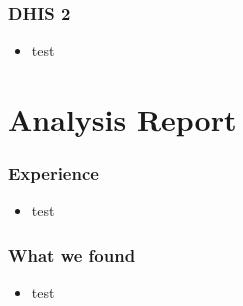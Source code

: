 \documentclass[12pt,norsk]{beamer}
\begin{document}
\begin{frame}
	
	\frametitle{DHIS 2}

	\begin{itemize}
		\item test
	\end{itemize}		

\end{frame}

\section{Analysis Report}

\begin{frame}
	
	\frametitle{Experience}

	\begin{itemize}
		\item test
	\end{itemize}		

\end{frame}

\begin{frame}
	
	\frametitle{What we found}

	\begin{itemize}
		\item test
	\end{itemize}		

\end{frame}
\end{document}

